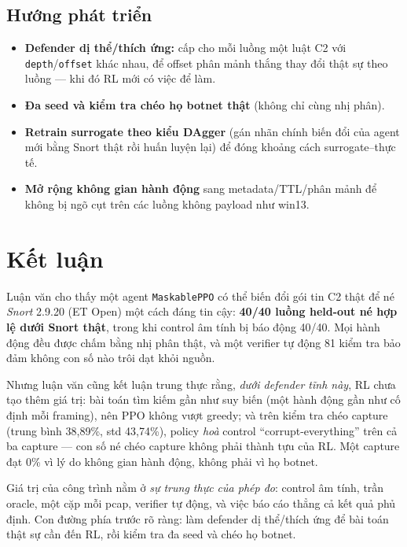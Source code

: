\documentclass[12pt,a4paper]{report}
\newcommand{\Snort}{\textit{Snort}}
\begin{document}
\section{Hướng phát triển}

\begin{itemize}
  \item \textbf{Defender dị thể/thích ứng:} cấp cho mỗi luồng một luật C2 với
        \texttt{depth}/\texttt{offset} khác nhau, để offset phân mảnh thắng thay đổi
        thật sự theo luồng — khi đó RL mới có việc để làm.
  \item \textbf{Đa seed và kiểm tra chéo họ botnet thật} (không chỉ cùng nhị phân).
  \item \textbf{Retrain surrogate theo kiểu DAgger} (gán nhãn chính biến đổi của agent
        mới bằng Snort thật rồi huấn luyện lại) để đóng khoảng cách surrogate--thực tế.
  \item \textbf{Mở rộng không gian hành động} sang metadata/TTL/phân mảnh để không bị
        ngõ cụt trên các luồng không payload như win13.
\end{itemize}

\chapter{Kết luận}
\label{ch:conclusion}

Luận văn cho thấy một agent \texttt{MaskablePPO} có thể biến đổi gói tin C2 thật để né
\Snort{} 2.9.20 (ET Open) một cách đáng tin cậy: \textbf{40/40 luồng held-out né hợp lệ
dưới Snort thật}, trong khi control âm tính bị báo động 40/40. Mọi hành động đều được
chấm bằng nhị phân thật, và một verifier tự động 81 kiểm tra bảo đảm không con số nào
trôi dạt khỏi nguồn.

Nhưng luận văn cũng kết luận trung thực rằng, \emph{dưới defender tĩnh này}, RL chưa
tạo thêm giá trị: bài toán tìm kiếm gần như suy biến (một hành động gần như cố định
mỗi framing), nên PPO không vượt greedy; và trên kiểm tra chéo capture (trung bình
38{,}89\%, std 43{,}74\%), policy \emph{hoà} control ``corrupt-everything'' trên cả ba
capture — con số né chéo capture không phải thành tựu của RL. Một capture đạt 0\% vì lý
do không gian hành động, không phải vì họ botnet.

Giá trị của công trình nằm ở \emph{sự trung thực của phép đo}: control âm tính, trần
oracle, một cặp mỗi pcap, verifier tự động, và việc báo cáo thẳng cả kết quả phủ định.
Con đường phía trước rõ ràng: làm defender dị thể/thích ứng để bài toán thật sự cần
đến RL, rồi kiểm tra đa seed và chéo họ botnet.
\end{document}
